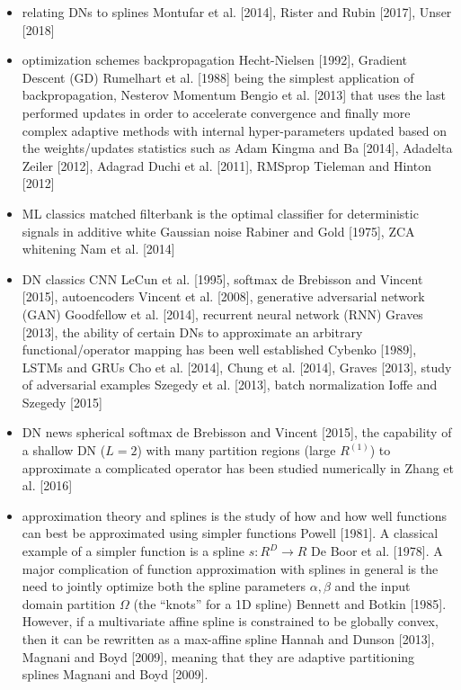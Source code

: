 \documentclass{article}
\begin{document}
\begin{itemize}
	\item relating DNs to splines
		\subitem Montufar et al. [2014], Rister and Rubin [2017], Unser [2018]
	\item optimization schemes
		\subitem backpropagation Hecht-Nielsen [1992], Gradient Descent (GD) Rumelhart et al. [1988] being the simplest application of backpropagation, Nesterov Momentum Bengio et al. [2013] that uses the last performed updates in order to accelerate convergence and finally more complex adaptive methods with internal hyper-parameters updated based on the weights/updates statistics such as Adam Kingma and Ba [2014], Adadelta Zeiler [2012], Adagrad Duchi et al. [2011], RMSprop Tieleman and Hinton [2012]
	\item ML classics
		\subitem matched filterbank is the optimal classifier for deterministic signals in additive white Gaussian noise Rabiner and Gold [1975], ZCA whitening Nam et al. [2014]
	\item DN classics
		\subitem CNN LeCun et al. [1995], softmax de Brebisson and Vincent [2015], autoencoders Vincent et al. [2008], generative adversarial network (GAN) Goodfellow et al. [2014], recurrent neural network (RNN) Graves [2013], the ability of certain DNs to approximate an arbitrary functional/operator mapping has been well established Cybenko [1989],  LSTMs and GRUs Cho et al. [2014], Chung et al. [2014], Graves [2013], study of adversarial examples Szegedy et al. [2013], batch normalization Ioffe and Szegedy [2015] 
	\item DN news
		\subitem spherical softmax  de Brebisson and Vincent [2015], the capability of a shallow DN ($L = 2$) with many partition regions (large $R^{(1)}$) to approximate a complicated operator has been studied numerically in Zhang et al. [2016]
	\item approximation theory and splines
		\subitem is the study of how and how well functions can best be approximated using simpler functions Powell [1981]. A classical example of a simpler function is a spline $s : R^D \rightarrow R$ De Boor et al. [1978]. A major complication of function approximation with splines in general is the need to jointly optimize both the spline parameters $\alpha, \beta$ and the input domain partition $\Omega$ (the ``knots'' for a 1D spline) Bennett and Botkin [1985]. However, if a multivariate affine spline is constrained to be globally convex, then it can be rewritten as a max-affine spline Hannah and Dunson [2013], Magnani and Boyd [2009], meaning that they are adaptive partitioning splines Magnani and Boyd [2009].
\end{itemize}
\end{document}
